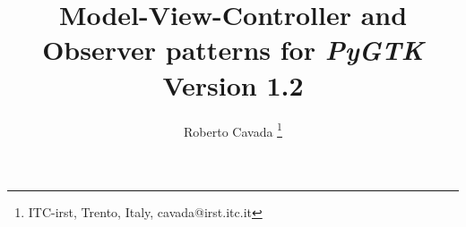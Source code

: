 \documentclass{article}
\newcommand{\appl}[1]{\textsl{#1}\xspace}
\newcommand{\pygtk}{\appl{PyGTK}}
\begin{document}
\title{Model-View-Controller and Observer patterns for \pygtk \\
Version 1.2}

\author{ Roberto Cavada \thanks{ITC-irst, Trento, Italy,
 cavada@irst.itc.it} }

\maketitle

\tableofcontents

\newpage



\newpage


\newpage


\newpage


\newpage


\newpage


\newpage


\newpage

\end{document}
